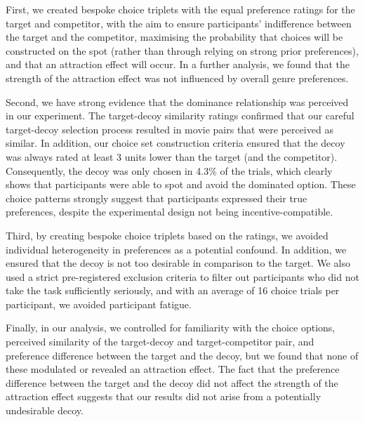 \documentclass[12pt, a4paper]{article}
\begin{document}
First, we created bespoke choice triplets with the equal preference ratings for the target and competitor, with the aim to ensure participants' indifference between the target and the competitor, maximising the probability that choices will be constructed on the spot (rather than through relying on strong prior preferences), and that an attraction effect will occur. 
In a further analysis, we found that the strength of the attraction effect was not influenced by overall genre preferences. 

Second, we have strong evidence that the dominance relationship was perceived in our experiment. The target-decoy similarity ratings confirmed that our careful target-decoy selection process resulted in movie pairs that were perceived as similar. In addition, our choice set construction criteria ensured that the decoy was always rated at least 3 units lower than the target (and the competitor). Consequently, the decoy was only chosen in 4.3\% of the trials, which clearly shows that participants were able to spot and avoid the dominated option. These choice patterns strongly suggest that participants expressed their true preferences, despite the experimental design not being incentive-compatible.

Third, by creating bespoke choice triplets based on the ratings, we avoided individual heterogeneity in preferences as a potential confound. In addition, we ensured that the decoy is not too desirable in comparison to the target. We also used a strict pre-registered exclusion criteria to filter out participants who did not take the task sufficiently seriously, and with an average of 16 choice trials per participant, we avoided participant fatigue.

Finally, in our analysis, we controlled for familiarity with the choice options, perceived similarity of the target-decoy and target-competitor pair, and preference difference between the target and the decoy, but we found that none of these modulated or revealed an attraction effect. The fact that the preference difference between the target and the decoy did not affect the strength of the attraction effect suggests that our results did not arise from a potentially undesirable decoy. 
\end{document}
